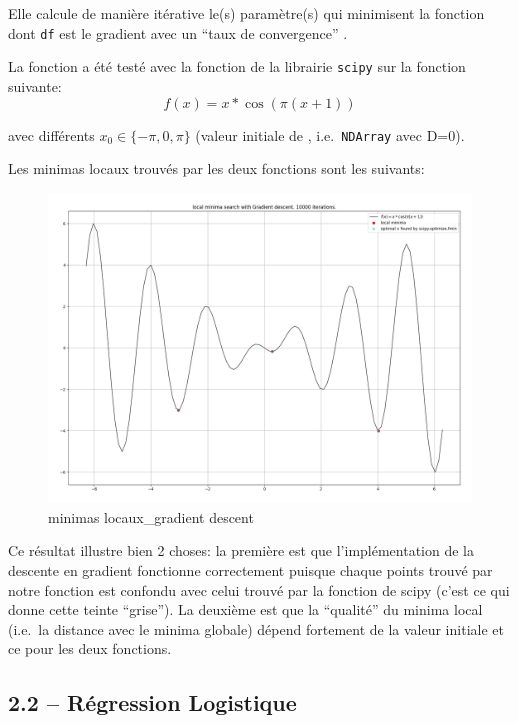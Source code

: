\documentclass[
]{article}
\begin{document}
Elle calcule de manière itérative le(s) paramètre(s)  qui
minimisent la fonction dont \texttt{df} est le gradient avec un ``taux
de convergence'' .

La fonction a été testé avec la fonction 
\cite{ScipyOptimizeFmin} de la librairie \texttt{scipy} sur la fonction
suivante: \[
f(x) = x * \cos(\pi  (x + 1))
\]

avec différents \(x_0 \in \{-\pi, 0, \pi\}\) (valeur initiale de
, i.e.~\texttt{NDArray} avec D=0).

Les minimas locaux trouvés par les deux fonctions sont les suivants:

\begin{figure}
\centering
\includegraphics[width=1\textwidth,height=\textheight]{../res/3.1_gradient_descent_minima.png}
\caption{minimas locaux\_gradient descent}
\end{figure}

Ce résultat illustre bien 2 choses: la première est que l'implémentation
de la descente en gradient fonctionne correctement puisque chaque points
trouvé par notre fonction est confondu avec celui trouvé par la fonction
de scipy (c'est ce qui donne cette teinte ``grise''). La deuxième est
que la ``qualité'' du minima local (i.e.~la distance avec le minima
globale) dépend fortement de la valeur initiale et ce pour les deux
fonctions.

\newpage{}

\subsection{2.2 -- Régression
Logistique}\label{ruxe9gression-logistique-1}
\end{document}
